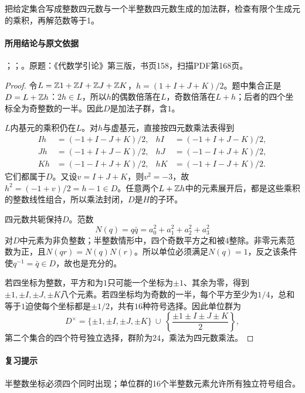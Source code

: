 把给定集合写成整数四元数与一个半整数四元数生成的加法群，检查有限个生成元的乘积，再解范数等于1。

\paragraph{所用结论与原文依据}

；；。原题：《代数学引论》第三版，书页158，扫描PDF第168页。


\begin{proof}

令$L=\mathbb Z1+\mathbb Z I+\mathbb Z J+\mathbb Z K$，$h=(1+I+J+K)/2$。题中集合正是$D=L+\mathbb Z h$：$2h\in L$，所以$h$的偶数倍落在$L$，奇数倍落在$L+h$；后者的四个坐标全为奇整数的一半。因此$D$是加法子群，含$1$。

$L$内基元的乘积仍在$L$。对$h$与虚基元，直接按四元数乘法表得到
\begin{align*}
Ih&=(-1+I-J+K)/2,&hI&=(-1+I+J-K)/2,\\
Jh&=(-1+I+J-K)/2,&hJ&=(-1-I+J+K)/2,\\
Kh&=(-1-I+J+K)/2,&hK&=(-1+I-J+K)/2.
\end{align*}
它们都属于$D$。又设$v=I+J+K$，则$v^2=-3$，故$h^2=(-1+v)/2=h-1\in D$。任意两个$L+\mathbb Z h$中的元素展开后，都是这些乘积的整数线性组合，所以乘法封闭，$D$是$H$的子环。

四元数共轭保持$D$。范数
\[
N(q)=q\bar q=a_0^2+a_1^2+a_2^2+a_3^2
\]
对$D$中元素为非负整数；半整数情形中，四个奇数平方之和被$4$整除。非零元素范数为正，且$N(qr)=N(q)N(r)$。所以单位必须满足$N(q)=1$，反之该条件使$q^{-1}=\bar q\in D$，故也是充分的。

若四坐标为整数，平方和为$1$只可能一个坐标为$\pm1$、其余为零，得到$\pm1,\pm I,\pm J,\pm K$八个元素。若四坐标均为奇数的一半，每个平方至少为$1/4$，总和等于$1$迫使每个坐标都是$\pm1/2$，共有$16$种符号选择。因此单位群为
\[
D^\times=\{\pm1,\pm I,\pm J,\pm K\}
\ \cup\ \left\{\frac{\pm1\pm I\pm J\pm K}{2}\right\},
\]
第二个集合的四个符号独立选择，群阶为$24$，乘法为四元数乘法。

\end{proof}

\paragraph{复习提示}

半整数坐标必须四个同时出现；单位群的16个半整数元素允许所有独立符号组合。


